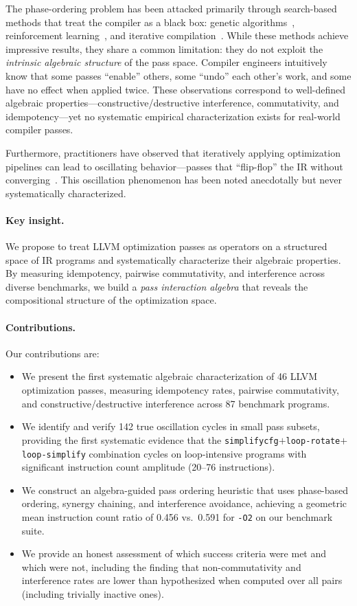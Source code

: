 \documentclass[11pt]{article}
\begin{document}
The phase-ordering problem has been attacked primarily through search-based methods that treat the compiler as a black box: genetic algorithms~\citep{pan2025synergy}, reinforcement learning~\citep{jain2022posetrl,deng2025compilerdream}, and iterative compilation~\citep{ashouri2017micomp}. While these methods achieve impressive results, they share a common limitation: they do not exploit the \emph{intrinsic algebraic structure} of the pass space. Compiler engineers intuitively know that some passes ``enable'' others, some ``undo'' each other's work, and some have no effect when applied twice. These observations correspond to well-defined algebraic properties---constructive/destructive interference, commutativity, and idempotency---yet no systematic empirical characterization exists for real-world compiler passes.

Furthermore, practitioners have observed that iteratively applying optimization pipelines can lead to oscillating behavior---passes that ``flip-flop'' the IR without converging~\citep{regehr2018llvm}. This oscillation phenomenon has been noted anecdotally but never systematically characterized.

\paragraph{Key insight.} We propose to treat LLVM optimization passes as operators on a structured space of IR programs and systematically characterize their algebraic properties. By measuring idempotency, pairwise commutativity, and interference across diverse benchmarks, we build a \emph{pass interaction algebra} that reveals the compositional structure of the optimization space.

\paragraph{Contributions.} Our contributions are:
\begin{itemize}[nosep]
  \item We present the first systematic algebraic characterization of 46 LLVM optimization passes, measuring idempotency rates, pairwise commutativity, and constructive/destructive interference across 87 benchmark programs.
  \item We identify and verify 142 true oscillation cycles in small pass subsets, providing the first systematic evidence that the \texttt{simplifycfg}$+$\texttt{loop-rotate}$+$\texttt{loop-simplify} combination cycles on loop-intensive programs with significant instruction count amplitude (20--76 instructions).
  \item We construct an algebra-guided pass ordering heuristic that uses phase-based ordering, synergy chaining, and interference avoidance, achieving a geometric mean instruction count ratio of 0.456 vs.\ 0.591 for \texttt{-O2} on our benchmark suite.
  \item We provide an honest assessment of which success criteria were met and which were not, including the finding that non-commutativity and interference rates are lower than hypothesized when computed over all pairs (including trivially inactive ones).
\end{itemize}
\end{document}
